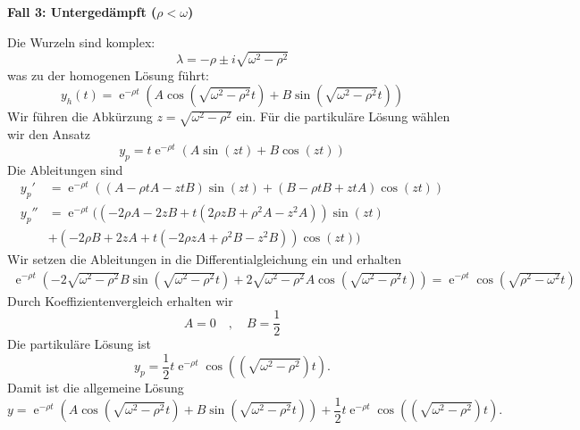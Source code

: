 {\textbf{Fall 3: Untergedämpft (\(\rho < \omega\))}

Die Wurzeln sind komplex:
\[
\lambda = -\rho \pm i\sqrt{\omega^2 - \rho^2}
\]
was zu der homogenen Lösung führt:
\[
y_h(t) = \operatorname{e}^{-\rho t}(A \cos(\sqrt{\omega^2 - \rho^2} t) + B \sin(\sqrt{\omega^2 - \rho^2} t))
\]
Wir führen die Abkürzung $z = \sqrt{\omega^2 - \rho^2}$ ein.
Für die partikuläre Lösung wählen wir den Ansatz
$$
y_p = t\operatorname{e}^{-\rho t}(A\sin(zt) + B\cos(zt)) 
$$
Die Ableitungen sind
\begin{align*}
y_p' &= \operatorname{e}^{-\rho t}((A- \rho t A - ztB)\sin(zt) + (B-\rho t B + ztA) \cos(zt))\\
y_p'' &= \operatorname{e}^{-\rho t}( (-2\rho A - 2zB + t(2\rho zB + \rho^2 A -z^2A)) \sin(zt) \\
&+
          (-2\rho B +2zA + t(-2\rho zA + \rho^2 B - z^2B)) \cos(zt))
\end{align*}
Wir setzen die Ableitungen in die Differentialgleichung ein und erhalten
\begin{align*}
\operatorname{e}^{-\rho t}(-2\sqrt{\omega^2 - \rho^2}B \sin(\sqrt{\omega^2-\rho^2}t)
+2\sqrt{\omega^2 - \rho^2}A \cos(\sqrt{\omega^2-\rho^2}t) ) = 
 \operatorname{e}^{-\rho t} \cos(\sqrt{\rho^2 - \omega^2}t)
\end{align*}
Durch Koeffizientenvergleich erhalten wir
$$
A=0 \quad , \quad B = \frac{1}{2}
$$
Die partikuläre Lösung ist
$$
y_p = \frac{1}{2}t\operatorname{e}^{-\rho t} \cos((\sqrt{\omega^2 - \rho^2})t).
$$
Damit ist die allgemeine Lösung
$$
y = \operatorname{e}^{-\rho t}(A \cos(\sqrt{\omega^2 - \rho^2} t) + B \sin(\sqrt{\omega^2 - \rho^2} t))+\frac{1}{2}t\operatorname{e}^{-\rho t} \cos((\sqrt{\omega^2 - \rho^2})t).
$$
}



